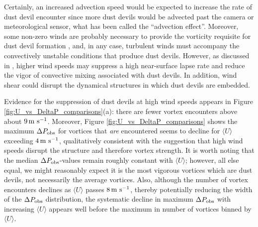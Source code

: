 \documentclass{aastex63}
\begin{document}
Certainly, an increased advection speed would be expected to increase the rate of dust devil encounter since more dust devils would be advected past the camera or meteorological sensor, what has been called the ``advection effect''. Moreover, some non-zero winds are probably necessary to provide the vorticity requisite for dust devil formation \citep{2020Icar..33813523J}, and, in any case, turbulent winds must accompany the convectively unstable conditions that produce dust devils. However, as discussed in \citet{2016SSRv..203..183R}, higher wind speeds may suppress a high near-surface lapse rate and reduce the vigor of convective mixing associated with dust devils. In addition, wind shear could disrupt the dynamical structures in which dust devils are embedded.

Evidence for the suppression of dust devils at high wind speeds appears in Figure \ref{fig:U_vs_DeltaP_comparisons}(a): there are fewer vortex encounters above about $9\,{\rm m\ s^{-1}}$. Moreover, Figure \ref{fig:U_vs_DeltaP_comparisons} shows the maximum $\Delta P_{\rm obs}$ for vortices that \emph{are} encountered seems to decline for $\langle U \rangle$ exceeding $4\,{\rm m\ s^{-1}}$, qualitatively consistent with the suggestion that high wind speeds disrupt the structure and therefore vortex strength. It is worth noting that the median $\Delta P_{\rm obs}$-values remain roughly constant with $\langle U \rangle$; however, all else equal, we might reasonably expect it is the most vigorous vortices which are dust devils, not necessarily the average vortices. Also, although the number of vortex encounters declines as $\langle U \rangle$ passes $8\, {\rm m\ s^{-1}}$, thereby potentially reducing the width of the $\Delta P_{\rm obs}$ distribution, the systematic decline in maximum $\Delta P_{\rm obs}$ with increasing $\langle U \rangle$ appears well before the maximum in number of vortices binned by $\langle U \rangle$.
\end{document}
